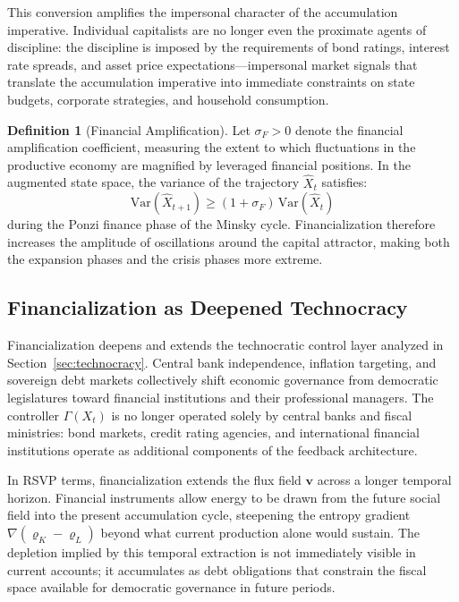 \documentclass[12pt,a4paper]{article}
\theoremstyle{definition}
\newtheorem{definition}{Definition}[section]
\theoremstyle{remark}
\begin{document}
This conversion amplifies the impersonal character of the accumulation imperative. Individual capitalists are no longer even the proximate agents of discipline: the discipline is imposed by the requirements of bond ratings, interest rate spreads, and asset price expectations---impersonal market signals that translate the accumulation imperative into immediate constraints on state budgets, corporate strategies, and household consumption.

\begin{definition}[Financial Amplification]
Let $\sigma_F > 0$ denote the financial amplification coefficient, measuring the extent to which fluctuations in the productive economy are magnified by leveraged financial positions. In the augmented state space, the variance of the trajectory $\hat{X}_t$ satisfies:
\begin{equation}
  \mathrm{Var}(\hat{X}_{t+1}) \geq (1 + \sigma_F)\,\mathrm{Var}(\hat{X}_t)
\end{equation}
during the Ponzi finance phase of the Minsky cycle. Financialization therefore increases the amplitude of oscillations around the capital attractor, making both the expansion phases and the crisis phases more extreme.
\end{definition}

\subsection{Financialization as Deepened Technocracy}

Financialization deepens and extends the technocratic control layer analyzed in Section~\ref{sec:technocracy}. Central bank independence, inflation targeting, and sovereign debt markets collectively shift economic governance from democratic legislatures toward financial institutions and their professional managers. The controller $\Gamma(X_t)$ is no longer operated solely by central banks and fiscal ministries: bond markets, credit rating agencies, and international financial institutions operate as additional components of the feedback architecture.

In RSVP terms, financialization extends the flux field $\mathbf{v}$ across a longer temporal horizon. Financial instruments allow energy to be drawn from the future social field into the present accumulation cycle, steepening the entropy gradient $\nabla(\varrho_K - \varrho_L)$ beyond what current production alone would sustain. The depletion implied by this temporal extraction is not immediately visible in current accounts; it accumulates as debt obligations that constrain the fiscal space available for democratic governance in future periods.
\end{document}
